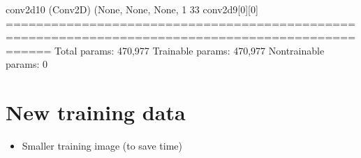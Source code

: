\documentclass[letterpaper,10pt,english]{sphinxmanual}
\begin{document}
\begin{sphinxVerbatim}[commandchars=\\\{\}]
conv2d\PYGZus{}10 (Conv2D)              (None, None, None, 1 33          conv2d\PYGZus{}9[0][0]                   
==================================================================================================
Total params: 470,977
Trainable params: 470,977
Non\PYGZhy{}trainable params: 0
\PYGZus{}\PYGZus{}\PYGZus{}\PYGZus{}\PYGZus{}\PYGZus{}\PYGZus{}\PYGZus{}\PYGZus{}\PYGZus{}\PYGZus{}\PYGZus{}\PYGZus{}\PYGZus{}\PYGZus{}\PYGZus{}\PYGZus{}\PYGZus{}\PYGZus{}\PYGZus{}\PYGZus{}\PYGZus{}\PYGZus{}\PYGZus{}\PYGZus{}\PYGZus{}\PYGZus{}\PYGZus{}\PYGZus{}\PYGZus{}\PYGZus{}\PYGZus{}\PYGZus{}\PYGZus{}\PYGZus{}\PYGZus{}\PYGZus{}\PYGZus{}\PYGZus{}\PYGZus{}\PYGZus{}\PYGZus{}\PYGZus{}\PYGZus{}\PYGZus{}\PYGZus{}\PYGZus{}\PYGZus{}\PYGZus{}\PYGZus{}\PYGZus{}\PYGZus{}\PYGZus{}\PYGZus{}\PYGZus{}\PYGZus{}\PYGZus{}\PYGZus{}\PYGZus{}\PYGZus{}\PYGZus{}\PYGZus{}\PYGZus{}\PYGZus{}\PYGZus{}\PYGZus{}\PYGZus{}\PYGZus{}\PYGZus{}\PYGZus{}\PYGZus{}\PYGZus{}\PYGZus{}\PYGZus{}\PYGZus{}\PYGZus{}\PYGZus{}\PYGZus{}\PYGZus{}\PYGZus{}\PYGZus{}\PYGZus{}\PYGZus{}\PYGZus{}\PYGZus{}\PYGZus{}\PYGZus{}\PYGZus{}\PYGZus{}\PYGZus{}\PYGZus{}\PYGZus{}\PYGZus{}\PYGZus{}\PYGZus{}\PYGZus{}\PYGZus{}\PYGZus{}
\end{sphinxVerbatim}


\section{New training data}
\label{\detokenize{05-SupervisedSegmentation:new-training-data}}\begin{itemize}
\item {} 
\sphinxAtStartPar
Smaller training image (to save time)

\end{itemize}
\end{document}
